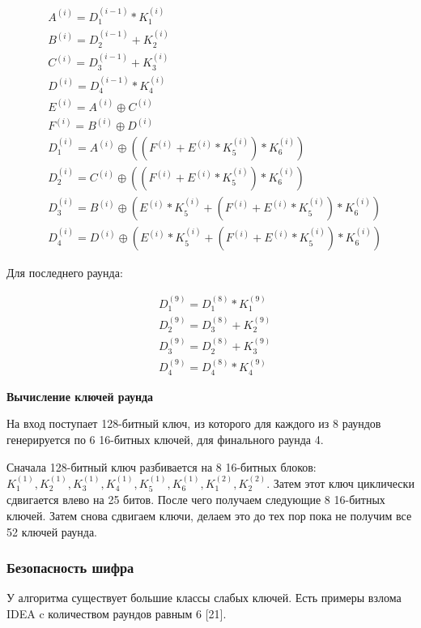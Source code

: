\documentclass[colorthm]{./civarticle}
\begin{document}
\begin{equation}
    \begin{aligned}
& A^{(i)}=D_1^{(i-1)} * K_1^{(i)} \\
& B^{(i)}=D_2^{(i-1)}+K_2^{(i)} \\
& C^{(i)}=D_3^{(i-1)}+K_3^{(i)} \\
& D^{(i)}=D_4^{(i-1)} * K_4^{(i)} \\
& E^{(i)}=A^{(i)} \oplus C^{(i)} \\
& F^{(i)}=B^{(i)} \oplus D^{(i)} \\
& D_1^{(i)}=A^{(i)} \oplus\left(\left(F^{(i)}+E^{(i)} * K_5^{(i)}\right) * K_6^{(i)}\right) \\
& D_2^{(i)}=C^{(i)} \oplus\left(\left(F^{(i)}+E^{(i)} * K_5^{(i)}\right) * K_6^{(i)}\right) \\
& D_3^{(i)}=B^{(i)} \oplus\left(E^{(i)} * K_5^{(i)}+\left(F^{(i)}+E^{(i)} * K_5^{(i)}\right) * K_6^{(i)}\right) \\
& D_4^{(i)}=D^{(i)} \oplus\left(E^{(i)} * K_5^{(i)}+\left(F^{(i)}+E^{(i)} * K_5^{(i)}\right) * K_6^{(i)}\right)
\end{aligned}
\end{equation}

Для последнего раунда:

\begin{equation}
    \begin{aligned}
& D_1^{(9)}=D_1^{(8)} * K_1^{(9)} \\
& D_2^{(9)}=D_3^{(8)}+K_2^{(9)} \\
& D_3^{(9)}=D_2^{(8)}+K_3^{(9)} \\
& D_4^{(9)}=D_4^{(8)} * K_4^{(9)}
\end{aligned}
\end{equation}

\textbf{Вычисление ключей раунда}

На вход поступает 128-битный ключ, из которого для каждого из 8 раундов генерируется по 6 16-битных ключей, для финального раунда 4.

Сначала 128-битный ключ разбивается на 8 16-битных блоков: $K^(1)_1, K^(1)_2, K^(1)_3, K^(1)_4, K^(1)_5, K^(1)_6, K^(2)_1, K^(2)_2$. Затем этот ключ циклически сдвигается влево на 25 битов. После чего получаем следующие 8 16-битных ключей. Затем снова сдвигаем ключи, делаем это до тех пор пока не получим все 52 ключей раунда.

\subsubsection{Безопасность шифра}
У алгоритма существует большие классы слабых ключей. Есть примеры взлома IDEA c количеством раундов равным 6 [21].
\end{document}
